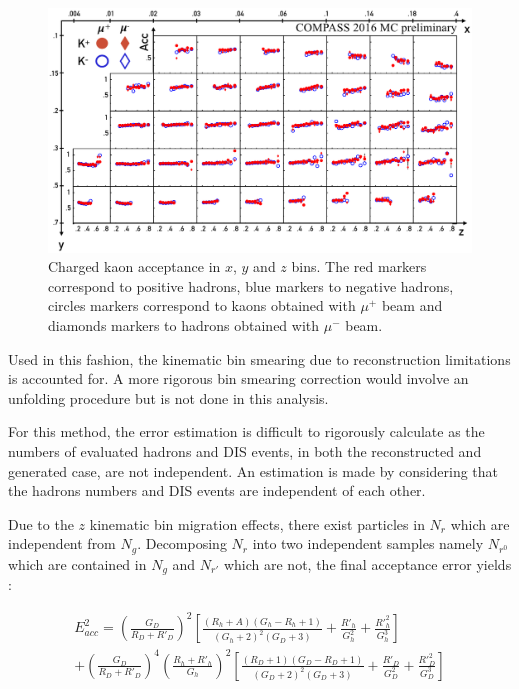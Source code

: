 \documentclass[letterpaper,12pt]{article}
\begin{document}
\begin{figure}
	\includegraphics[scale=0.5]{./gfx/AccK.png}
	\caption{Charged kaon acceptance in $x$, $y$ and $z$ bins. The red markers correspond to positive hadrons, blue markers to negative hadrons, circles markers correspond to kaons obtained with $\mu^+$ beam and diamonds markers to hadrons obtained with $\mu^-$ beam.}
	\label{AccK}
\end{figure}

Used in this fashion, the kinematic bin smearing due to reconstruction limitations is accounted for. A more rigorous
bin smearing correction would involve an unfolding procedure but is not done in this analysis.

For this method, the error estimation is difficult to rigorously calculate as the numbers of evaluated hadrons and DIS events,
in both the reconstructed and generated case, are not independent. An estimation is made by considering that the hadrons numbers
and DIS events are independent of each other.

Due to the $z$ kinematic bin migration effects, there exist particles in $N_r$ which are independent from $N_g$. Decomposing $N_r$
into two independent samples namely $N_{r^0}$ which are contained in $N_g$ and $N_{r'}$ which are not, the final acceptance error yields :

\begin{equation}
  \begin{split}
    E^2_{acc} = \left (\frac{G_D}{R_D+R'_{D}}\right )^2\left [\frac{(R_h+A)(G_h-R_h+1)}{(G_h+2)^2(G_D+3)}+\frac{R'_{h}}{G^2_h}+\frac{R'^2_h}{G^3_h}\right ] \\
                + \left (\frac{G_D}{R_D+R'_{D}}\right )^4\left (\frac{R_h+R'_h}{G_h}\right )^2\left [\frac{(R_D+1)(G_D-R_D+1)}{(G_D+2)^2(G_D+3)}+\frac{R'_D}{G^2_D}+\frac{R'^2_D}{G^3_D}\right ]
  \end{split}
\end{equation}
\end{document}
